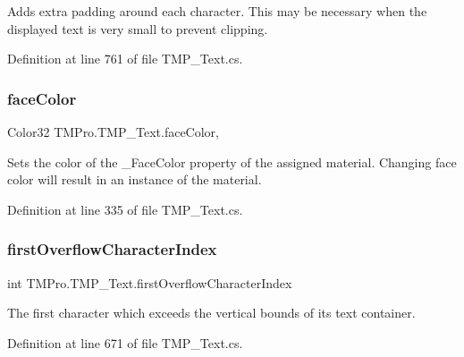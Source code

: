 Adds extra padding around each character. This may be necessary when the displayed text is very small to prevent clipping. 



Definition at line 761 of file T\+M\+P\+\_\+\+Text.\+cs.

\mbox{\label{class_t_m_pro_1_1_t_m_p___text_a636390b562bc0a1f6794db74660e2291}} 
\subsubsection{\texorpdfstring{faceColor}{faceColor}}
{\footnotesize\ttfamily Color32 T\+M\+Pro.\+T\+M\+P\+\_\+\+Text.\+face\+Color\hspace{0.3cm}{\ttfamily [get]}, {\ttfamily [set]}}



Sets the color of the \+\_\+\+Face\+Color property of the assigned material. Changing face color will result in an instance of the material. 



Definition at line 335 of file T\+M\+P\+\_\+\+Text.\+cs.

\mbox{\label{class_t_m_pro_1_1_t_m_p___text_a41e1120f3d5667fbe6ad537937a579fa}} 
\subsubsection{\texorpdfstring{firstOverflowCharacterIndex}{firstOverflowCharacterIndex}}
{\footnotesize\ttfamily int T\+M\+Pro.\+T\+M\+P\+\_\+\+Text.\+first\+Overflow\+Character\+Index\hspace{0.3cm}{\ttfamily [get]}}



The first character which exceeds the vertical bounds of its text container. 



Definition at line 671 of file T\+M\+P\+\_\+\+Text.\+cs.

\mbox{\label{class_t_m_pro_1_1_t_m_p___text_aae7cd2f640ffd5936f7e8a09d95a221d}} 
